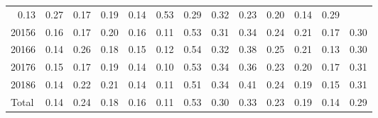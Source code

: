 \begin{table}[!h]
\begin{tabular}{lllllllllllll}
  \multicolumn{1}{|r}{0.13} &
  \multicolumn{1}{r}{0.27} &
  \multicolumn{1}{r}{0.17} &
  \multicolumn{1}{r}{0.19} &
  \multicolumn{1}{r}{0.14} &
  \multicolumn{1}{r}{0.53} &
  \multicolumn{1}{r}{0.29} &
  \multicolumn{1}{r}{0.32} &
  \multicolumn{1}{r}{0.23} &
  \multicolumn{1}{r}{0.20} &
  \multicolumn{1}{r}{0.14} &
  \multicolumn{1}{r}{0.29} \\
\multicolumn{1}{l}{\hspace{1em}20156} &
  \multicolumn{1}{|r}{0.16} &
  \multicolumn{1}{r}{0.17} &
  \multicolumn{1}{r}{0.20} &
  \multicolumn{1}{r}{0.16} &
  \multicolumn{1}{r}{0.11} &
  \multicolumn{1}{r}{0.53} &
  \multicolumn{1}{r}{0.31} &
  \multicolumn{1}{r}{0.34} &
  \multicolumn{1}{r}{0.24} &
  \multicolumn{1}{r}{0.21} &
  \multicolumn{1}{r}{0.17} &
  \multicolumn{1}{r}{0.30} \\
\multicolumn{1}{l}{\hspace{1em}20166} &
  \multicolumn{1}{|r}{0.14} &
  \multicolumn{1}{r}{0.26} &
  \multicolumn{1}{r}{0.18} &
  \multicolumn{1}{r}{0.15} &
  \multicolumn{1}{r}{0.12} &
  \multicolumn{1}{r}{0.54} &
  \multicolumn{1}{r}{0.32} &
  \multicolumn{1}{r}{0.38} &
  \multicolumn{1}{r}{0.25} &
  \multicolumn{1}{r}{0.21} &
  \multicolumn{1}{r}{0.13} &
  \multicolumn{1}{r}{0.30} \\
\multicolumn{1}{l}{\hspace{1em}20176} &
  \multicolumn{1}{|r}{0.15} &
  \multicolumn{1}{r}{0.17} &
  \multicolumn{1}{r}{0.19} &
  \multicolumn{1}{r}{0.14} &
  \multicolumn{1}{r}{0.10} &
  \multicolumn{1}{r}{0.53} &
  \multicolumn{1}{r}{0.34} &
  \multicolumn{1}{r}{0.36} &
  \multicolumn{1}{r}{0.23} &
  \multicolumn{1}{r}{0.20} &
  \multicolumn{1}{r}{0.17} &
  \multicolumn{1}{r}{0.31} \\
\multicolumn{1}{l}{\hspace{1em}20186} &
  \multicolumn{1}{|r}{0.14} &
  \multicolumn{1}{r}{0.22} &
  \multicolumn{1}{r}{0.21} &
  \multicolumn{1}{r}{0.14} &
  \multicolumn{1}{r}{0.11} &
  \multicolumn{1}{r}{0.51} &
  \multicolumn{1}{r}{0.34} &
  \multicolumn{1}{r}{0.41} &
  \multicolumn{1}{r}{0.24} &
  \multicolumn{1}{r}{0.19} &
  \multicolumn{1}{r}{0.15} &
  \multicolumn{1}{r}{0.31} \\
\multicolumn{1}{l}{\hspace{1em}Total} &
  \multicolumn{1}{|r}{0.14} &
  \multicolumn{1}{r}{0.24} &
  \multicolumn{1}{r}{0.18} &
  \multicolumn{1}{r}{0.16} &
  \multicolumn{1}{r}{0.11} &
  \multicolumn{1}{r}{0.53} &
  \multicolumn{1}{r}{0.30} &
  \multicolumn{1}{r}{0.33} &
  \multicolumn{1}{r}{0.23} &
  \multicolumn{1}{r}{0.19} &
  \multicolumn{1}{r}{0.14} &
  \multicolumn{1}{r}{0.29} \\
\cline{1-13}
\end{tabular}
\end{table}
